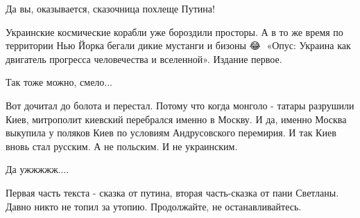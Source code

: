 \begin{itemize}
Да вы, оказывается, сказочница похлеще Путина!

 

Украинские космические корабли уже бороздили просторы. А в то же время по
территории Нью Йорка бегали дикие мустанги и бизоны 😂🤣 «Опус: Украина как
двигатель прогресса человечества и вселенной». Издание первое.

 
Так тоже можно, смело...

 

Вот дочитал до болота и перестал. Потому что когда монголо - татары разрушили
Киев, митрополит киевский перебрался именно в Москву. И да, именно Москва
выкупила у поляков Киев по условиям Андрусовского перемирия. И так Киев вновь
стал русским. А не польским. И не украинским.


 
Да ужжжжж....

 

Первая часть текста - сказка от путина, вторая часть-сказка от пани Светланы.
Давно никто не топил за утопию. Продолжайте, не останавливайтесь.

 

\end{itemize}
